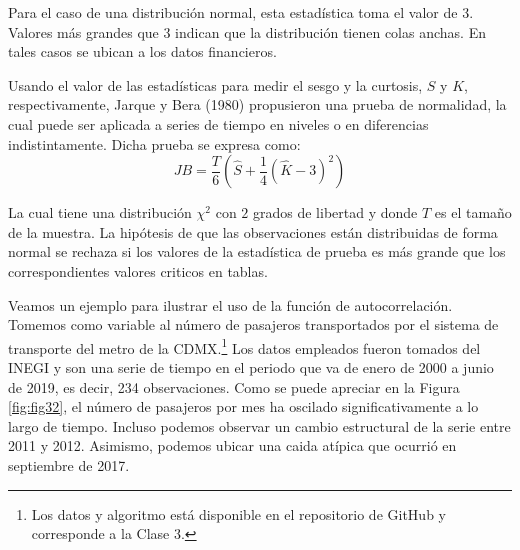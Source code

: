 \documentclass[
]{book}
\begin{document}
Para el caso de una distribución normal, esta estadística toma el valor de 3. Valores más grandes que 3 indican que la distribución tienen colas anchas. En tales casos se ubican a los datos financieros.

Usando el valor de las estadísticas para medir el sesgo y la curtosis, \(S\) y \(K\), respectivamente, Jarque y Bera (1980) propusieron una prueba de normalidad, la cual puede ser aplicada a series de tiempo en niveles o en diferencias indistintamente. Dicha prueba se expresa como:
\begin{equation}
    JB = \frac{T}{6} \left(\hat{S} + \frac{1}{4} (\hat{K} - 3)^2 \right) 
    \label{eq:eqautocorr8}
\end{equation}

La cual tiene una distribución \(\chi^2\) con \(2\) grados de libertad y donde \(T\) es el tamaño de la muestra. La hipótesis de que las observaciones están distribuidas de forma normal se rechaza si los valores de la estadística de prueba es más grande que los correspondientes valores criticos en tablas.

Veamos un ejemplo para ilustrar el uso de la función de autocorrelación. Tomemos como variable al número de pasajeros transportados por el sistema de transporte del metro de la CDMX.\footnote{Los datos y algoritmo está disponible en el repositorio de GitHub y corresponde a la Clase 3.} Los datos empleados fueron tomados del INEGI y son una serie de tiempo en el periodo que va de enero de 2000 a junio de 2019, es decir, 234 observaciones. Como se puede apreciar en la Figura \ref{fig:fig32}, el número de pasajeros por mes ha oscilado significativamente a lo largo de tiempo. Incluso podemos observar un cambio estructural de la serie entre 2011 y 2012. Asimismo, podemos ubicar una caida atípica que ocurrió en septiembre de 2017.
\end{document}
